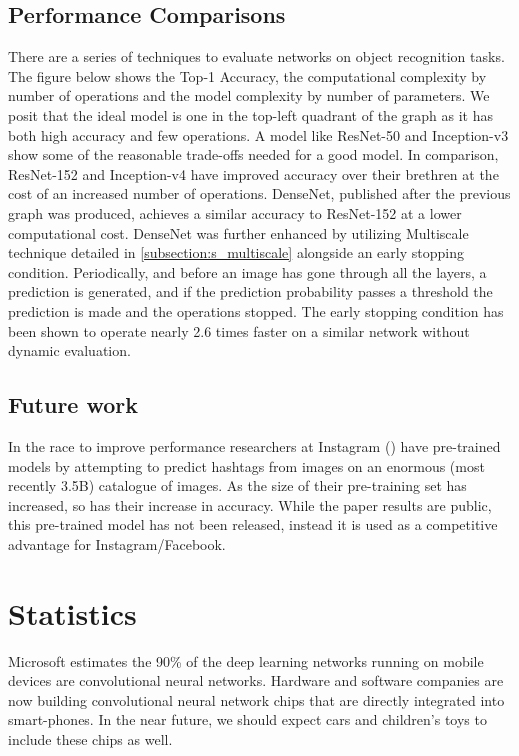 \subsection{Performance Comparisons}\label{subsection:o_performance}
There are a series of techniques to evaluate networks on object recognition tasks.  
The figure below shows the Top-1 Accuracy, the computational complexity by number of operations and the model complexity by number of parameters.  
We posit that the ideal model is one in the top-left quadrant of the graph as it has both high accuracy and few operations.  
A model like ResNet-50 and Inception-v3 show some of the reasonable trade-offs needed for a good model.  
In comparison, ResNet-152 and Inception-v4 have improved accuracy over their brethren at the cost of an increased number of operations.  
DenseNet, published after the previous graph was produced, achieves a similar accuracy to ResNet-152 at a lower computational cost.  
DenseNet was further enhanced by utilizing Multiscale technique detailed in \ref{subsection:s_multiscale} alongside an early stopping condition.  Periodically, and before an image has gone through all the layers, a prediction is generated, and if the prediction probability passes a threshold the prediction is made and the operations stopped.  
The early stopping condition has been shown to operate nearly 2.6 times faster on a similar network without dynamic evaluation.

\subsection{Future work}\label{subsection:o_futureWork}
In the race to improve performance researchers at Instagram (\cite{DBLP:journals/corr/abs-1805-00932}) have pre-trained models by attempting to predict hashtags from images on an enormous (most recently 3.5B) catalogue of images.  
As the size of their pre-training set has increased, so has their increase in accuracy.  
While the paper results are public, this pre-trained model has not been released, instead it is used as a competitive advantage for Instagram/Facebook.
 

\section{Statistics}\label{section:statistics}
Microsoft estimates the 90\% of the deep learning networks running on mobile devices are convolutional neural networks.  
Hardware and software companies are now building convolutional neural network chips that are directly integrated into smart-phones.  
In the near future, we should expect cars and children's toys to include these chips as well.

